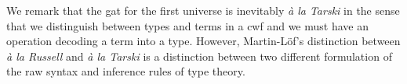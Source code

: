 \documentclass{lmcs}
\newcommand{\s}{\mathrm{s}}
\newcommand{\Ta}{\mathrm{T}}
\newcommand{\Level}{\mathrm{Level}}
\def\Ctx{\mathrm{Ctx}}
\begin{document}
We remark that the gat for the first universe is inevitably {\em \`a la Tarski} in the sense that we distinguish between types and terms in a cwf and we must have an operation decoding a term into a type. However, Martin-Löf's distinction between {\em \`a la Russell} and {\em \`a la Tarski} is a distinction between two different formulation of the raw syntax and inference rules of type theory.

%
%
%
\end{document}

